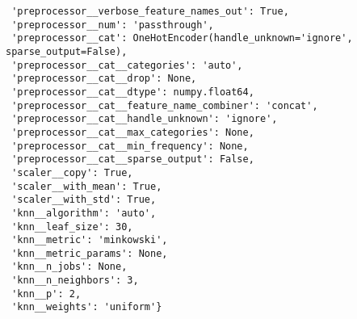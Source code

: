 \documentclass[
  letterpaper,
  DIV=11,
  numbers=noendperiod]{scrreprt}
\begin{document}
\begin{verbatim}
 'preprocessor__verbose_feature_names_out': True,
 'preprocessor__num': 'passthrough',
 'preprocessor__cat': OneHotEncoder(handle_unknown='ignore', sparse_output=False),
 'preprocessor__cat__categories': 'auto',
 'preprocessor__cat__drop': None,
 'preprocessor__cat__dtype': numpy.float64,
 'preprocessor__cat__feature_name_combiner': 'concat',
 'preprocessor__cat__handle_unknown': 'ignore',
 'preprocessor__cat__max_categories': None,
 'preprocessor__cat__min_frequency': None,
 'preprocessor__cat__sparse_output': False,
 'scaler__copy': True,
 'scaler__with_mean': True,
 'scaler__with_std': True,
 'knn__algorithm': 'auto',
 'knn__leaf_size': 30,
 'knn__metric': 'minkowski',
 'knn__metric_params': None,
 'knn__n_jobs': None,
 'knn__n_neighbors': 3,
 'knn__p': 2,
 'knn__weights': 'uniform'}
\end{verbatim}
\end{document}
